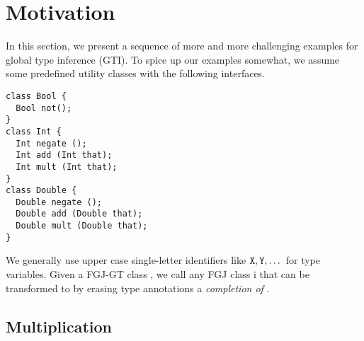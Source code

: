 \section{Motivation}
\label{sec:motivation}


In this section, we present a sequence of more and more challenging
examples for global type inference (GTI). To spice up our examples
somewhat, we assume some predefined utility classes with the following
interfaces.
\begin{lstlisting}[style=fgj]
class Bool {
  Bool not(); 
}
class Int {
  Int negate ();
  Int add (Int that);
  Int mult (Int that);
}
class Double {
  Double negate ();
  Double add (Double that);
  Double mult (Double that);
}
\end{lstlisting}

We generally use upper case single-letter identifiers like ${\tt X},
{\tt Y}, \dots$ for type variables.
Given a FGJ-GT class , 
we call any FGJ class \CL i that can be transformed to  by
erasing type annotations a \emph{completion of  }.

\subsection{Multiplication}
\label{sec:multiplication}

